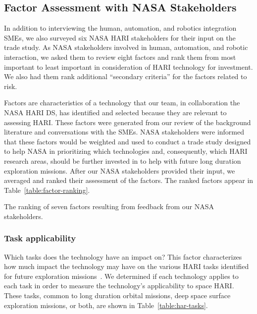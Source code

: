 \subsection{Factor Assessment with NASA Stakeholders}
In addition to interviewing the human, automation, and robotics integration SMEs, we also surveyed six NASA HARI stakeholders for their input on the trade study.
As NASA stakeholders involved in human, automation, and robotic interaction, we asked them to review eight factors and rank them from most important to least important in consideration of HARI technology for investment.
We also had them rank additional ``secondary criteria'' for the factors related to risk.

Factors are characteristics of a technology that our team, in collaboration the NASA HARI DS, has identified and selected because they are relevant to assessing HARI.
These factors were generated from our review of the background literature and conversations with the SMEs.
NASA stakeholders were informed that these factors would be weighted and used to conduct a trade study designed to help NASA in prioritizing which technologies and, consequently, which HARI research areas, should be further invested in to help with future long duration exploration missions.
After our NASA stakeholders provided their input, we averaged and ranked their assessment of the factors.
The ranked factors appear in Table~\ref{table:factor-ranking}.

\begin{table}[tb]
    \centering
    \caption[The ranking of seven factors resulting from feedback from our NASA stakeholders]{The ranking of seven factors resulting from feedback from our NASA stakeholders.}
    \label{table:factor-ranking}
\end{table}

\subsubsection{Task applicability}
Which tasks does the technology have an impact on? This factor characterizes how much impact the technology may have on the various HARI tasks identified for future exploration missions~\citep{marquez2017future}.
We determined if each technology applies to each task in order to measure the technology's applicability to space HARI.
These tasks, common to long duration orbital missions, deep space surface exploration missions, or both, are shown in Table~\ref{table:har-tasks}.

